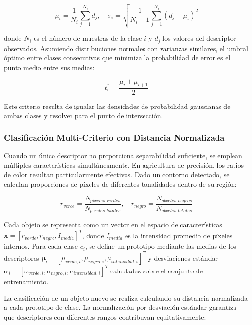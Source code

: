 \begin{equation}
\mu_i = \frac{1}{N_i}\sum_{j=1}^{N_i} d_j, \quad \sigma_i = \sqrt{\frac{1}{N_i-1}\sum_{j=1}^{N_i}(d_j - \mu_i)^2}
\end{equation}

donde $N_i$ es el número de muestras de la clase $i$ y $d_j$ los valores del descriptor observados. Asumiendo distribuciones normales con varianzas similares, el umbral óptimo entre clases consecutivas que minimiza la probabilidad de error es el punto medio entre sus medias:

\begin{equation}
t_i^* = \frac{\mu_i + \mu_{i+1}}{2}
\end{equation}

Este criterio resulta de igualar las densidades de probabilidad gaussianas de ambas clases y resolver para el punto de intersección.

\subsubsection{Clasificación Multi-Criterio con Distancia Normalizada}

Cuando un único descriptor no proporciona separabilidad suficiente, se emplean múltiples características simultáneamente. En agricultura de precisión, los ratios de color resultan particularmente efectivos. Dado un contorno detectado, se calculan proporciones de píxeles de diferentes tonalidades dentro de su región:

\begin{equation}
r_{verde} = \frac{N_{píxeles\_verdes}}{N_{píxeles\_totales}}, \quad r_{negro} = \frac{N_{píxeles\_negros}}{N_{píxeles\_totales}}
\end{equation}

Cada objeto se representa como un vector en el espacio de características $\mathbf{x} = [r_{verde}, r_{negro}, I_{media}]^T$, donde $I_{media}$ es la intensidad promedio de píxeles internos. Para cada clase $c_i$, se define un prototipo mediante las medias de los descriptores $\boldsymbol{\mu}_i = [\mu_{verde,i}, \mu_{negro,i}, \mu_{intensidad,i}]^T$ y desviaciones estándar $\boldsymbol{\sigma}_i = [\sigma_{verde,i}, \sigma_{negro,i}, \sigma_{intensidad,i}]^T$ calculadas sobre el conjunto de entrenamiento.

La clasificación de un objeto nuevo se realiza calculando su distancia normalizada a cada prototipo de clase. La normalización por desviación estándar garantiza que descriptores con diferentes rangos contribuyan equitativamente:

